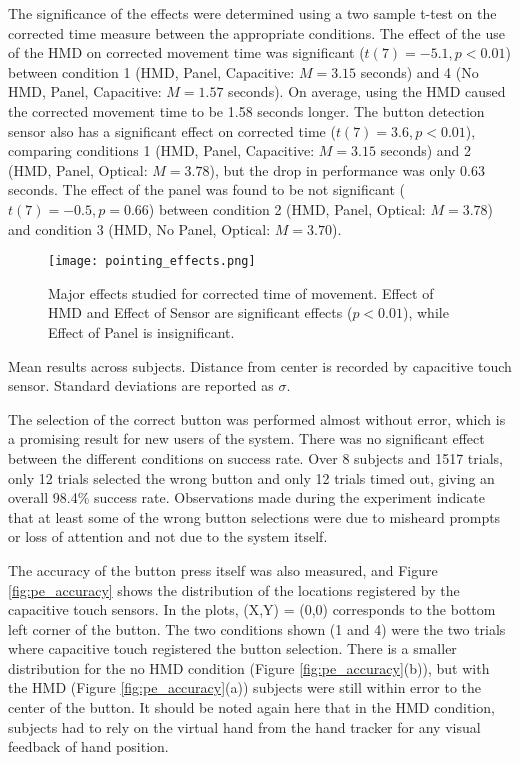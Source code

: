 The significance of the effects were determined using a two sample t-test on the corrected time measure between the appropriate conditions.
The effect of the use of the HMD on corrected movement time was significant ($t(7)=-5.1, p < 0.01$) between condition 1 (HMD, Panel, Capacitive: $M=3.15$ seconds) and 4 (No HMD, Panel, Capacitive: $M=1.57$ seconds).
On average, using the HMD caused the corrected movement time to be 1.58 seconds longer.
The button detection sensor also has a significant effect on corrected time ($t(7)=3.6, p < 0.01$), comparing conditions 1 (HMD, Panel, Capacitive: $M=3.15$ seconds) and 2 (HMD, Panel, Optical: $M=3.78$), but the drop in performance was only 0.63 seconds.
The effect of the panel was found to be not significant ($t(7)=-0.5, p=0.66$) between condition 2 (HMD, Panel, Optical: $M=3.78$) and condition 3 (HMD, No Panel, Optical: $M=3.70$).

\begin{figure}
    \centering
    \texttt{[image: pointing\_effects.png]}
    \caption{Major effects studied for corrected time of movement. Effect of HMD and Effect of Sensor are significant effects ($p<0.01$), while Effect of Panel is insignificant.}
    \label{fig:pe_effects}
\end{figure}

\begin{table}
    \centering
    \caption{Mean results across subjects. Distance from center is recorded by capacitive touch sensor. Standard deviations are reported as $\sigma$.}
    \label{tab:pe_results}
\end{table}

The selection of the correct button was performed almost without error, which is a promising result for new users of the system.
There was no significant effect between the different conditions on success rate.
Over 8 subjects and 1517 trials, only 12 trials selected the wrong button and only 12 trials timed out, giving an overall 98.4\% success rate.
Observations made during the experiment indicate that at least some of the wrong button selections were due to misheard prompts or loss of attention and not due to the system itself.

The accuracy of the button press itself was also measured, and Figure \ref{fig:pe_accuracy} shows the distribution of the locations registered by the capacitive touch sensors.
In the plots, (X,Y) = (0,0) corresponds to the bottom left corner of the button.
The two conditions shown (1 and 4) were the two trials where capacitive touch registered the button selection.
There is a smaller distribution for the no HMD condition (Figure \ref{fig:pe_accuracy}(b)), but with the HMD (Figure \ref{fig:pe_accuracy}(a)) subjects were still within error to the center of the button.
It should be noted again here that in the HMD condition, subjects had to rely on the virtual hand from the hand tracker for any visual feedback of hand position.

